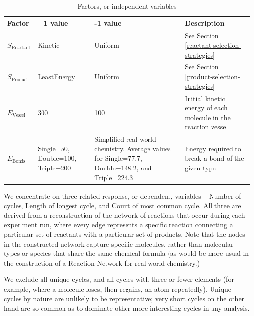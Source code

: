 \begin{table}
	\scriptsize
	\caption{Factors, or independent variables}\label{tbl:factors}
	\begin{tabular}{p{1.4cm}p{2.2cm}p{4.4cm}p{5.5cm}}
		\hline\noalign{\smallskip}
		Factor                & +1 value                          & -1 value                                                                                        & Description                                                    \\
		\hline
		\noalign{\smallskip}
		$S_\mathrm{Reactant}$ & Kinetic                           & Uniform                                                                                         & See Section \cref{reactant-selection-strategies}               \\
		$S_\mathrm{Product}$  & LeastEnergy                       & Uniform                                                                                         & See Section \cref{product-selection-strategies}                \\
		$E_\mathrm{Vessel}$   & 300                               & 100                                                                                             & Initial kinetic energy of each molecule in the reaction vessel \\
		$E_\mathrm{Bonds}$    & Single=50, Double=100, Triple=200 & Simplified real-world chemistry. Average values for Single=77.7, Double=148.2, and Triple=224.3 & Energy required to break a bond of the given type              \\
		\hline
	\end{tabular}
\end{table}

We concentrate on three related response, or dependent, variables -- Number of cycles, Length of longest cycle, and Count of most common cycle. All three are derived from a reconstruction of the network of reactions that occur during each experiment run, where every edge represents a specific reaction connecting a particular set of reactants with a particular set of products. Note that the nodes in the constructed network capture specific molecules, rather than molecular types or species that share the same chemical formula (as would be more usual in the construction of a Reaction Network for real-world chemistry.)

We exclude all unique cycles, and all cycles with three or fewer elements (for example, where a molecule loses, then regains, an atom repeatedly). Unique cycles by nature are unlikely to be representative; very short cycles on the other hand are so common as to dominate other more interesting cycles in any analysis.

